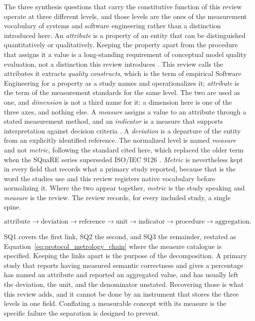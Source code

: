 The three synthesis questions that carry the constitutive function of this review operate at three different levels, and those levels are the ones of the measurement vocabulary of systems and software engineering rather than a distinction introduced here. An \textit{attribute} is a property of an entity that can be distinguished quantitatively or qualitatively. Keeping the property apart from the procedure that assigns it a value is a long-standing requirement of conceptual model quality evaluation, not a distinction this review introduces \cite{Moody2005ConceptualQuality}. This review calls the attributes it extracts \textit{quality constructs}, which is the term of empirical Software Engineering for a property as a study names and operationalizes it; \textit{attribute} is the term of the measurement standards for the same level. The two are used as one, and \textit{dimension} is not a third name for it: a dimension here is one of the three axes, and nothing else. A \textit{measure} assigns a value to an attribute through a stated measurement method, and an \textit{indicator} is a measure that supports interpretation against decision criteria \cite{ISO15939,ISO25020,SWEBOK2024}. A \textit{deviation} is a departure of the entity from an explicitly identified reference. The normalized level is named \textit{measure} and not \textit{metric}, following the standard cited here, which replaced the older term when the SQuaRE series superseded ISO/IEC 9126 \cite{ISO25000,ISO25020}. \textit{Metric} is nevertheless kept in every field that records what a primary study reported, because that is the word the studies use and this review registers native vocabulary before normalizing it. Where the two appear together, \textit{metric} is the study speaking and \textit{measure} is the review. The review records, for every included study, a single spine.

\begin{equation}
\text{attribute} \rightarrow \text{deviation} \rightarrow \text{reference} \rightarrow \text{unit} \rightarrow \text{indicator} \rightarrow \text{procedure} \rightarrow \text{aggregation}.
\label{eq:protocol_quality_spine}
\end{equation}

SQ1 covers the first link, SQ2 the second, and SQ3 the remainder, restated as Equation~\ref{eq:protocol_metrology_chain} where the measure catalogue is specified. Keeping the links apart is the purpose of the decomposition. A primary study that reports having measured semantic correctness and gives a percentage has named an attribute and reported an aggregated value, and has usually left the deviation, the unit, and the denominator unstated. Recovering those is what this review adds, and it cannot be done by an instrument that stores the three levels in one field. Conflating a measurable concept with its measure is the specific failure the separation is designed to prevent.

